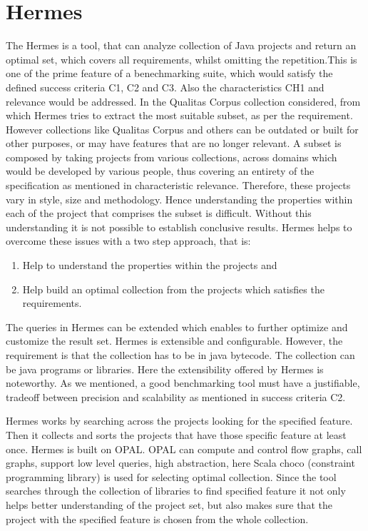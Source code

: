 \documentclass[authoryear,preprint]{sigplanconf}
\begin{document}
\section{Hermes}
\label{sec:sec_hermes}
The Hermes\cite{Reif:2017:HAC:3088515.3088523} is a tool, that can analyze collection of Java projects and return an optimal set, which covers all requirements, whilst omitting the repetition.This is one of the prime feature of a benechmarking suite, which would satisfy the defined success criteria C1, C2 and C3. Also the characteristics CH1 and relevance would be addressed. In the Qualitas Corpus\cite{5693210} \cite{Dingsoyr:2013:RCL:2507288.2507322} collection considered, from which Hermes tries to extract the most suitable subset, as per the requirement. However collections like Qualitas Corpus and others can be outdated or built for other purposes, or may have features that are no longer relevant. A subset is composed by taking projects from various collections, across domains which would be developed by various people, thus covering an entirety of the specification as mentioned in characteristic relevance. Therefore, these projects vary in style, size and methodology. Hence understanding the properties within each of the project that comprises the subset is difficult. Without this understanding it is not possible to establish conclusive results. Hermes helps to overcome these issues with a two step approach, that is:

\begin{enumerate}
	\item Help to understand the properties within the projects and 
	\item Help build an optimal collection from the projects which satisfies the requirements.
\end{enumerate}

The queries in Hermes can be extended which enables to further optimize and customize the result set. Hermes is extensible and configurable. However, the requirement is that the collection has to be in java bytecode. The collection can be java programs or libraries. Here the extensibility offered by Hermes is noteworthy. As we mentioned, a good benchmarking tool must have a justifiable, tradeoff between precision and scalability as mentioned in success criteria C2. 

Hermes works by searching across the projects looking for the specified feature. Then it collects and sorts the projects that have those specific feature at least once. Hermes is built on OPAL. OPAL can compute and control flow graphs, call graphs, support low level queries, high abstraction, here Scala choco (constraint programming library) is used for selecting optimal collection. Since the tool searches through the collection of libraries to find specified feature it not only helps better understanding of the project set, but also makes sure that the project with the specified feature is chosen from the whole collection.
\end{document}
